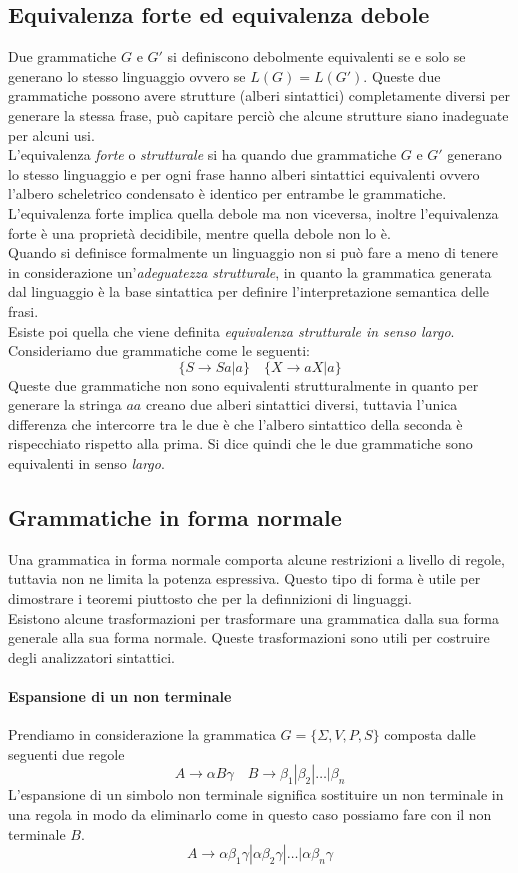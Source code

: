 \subsection{Equivalenza forte ed equivalenza debole}
Due grammatiche $ G $ e $ G' $ si definiscono debolmente equivalenti se e solo se generano lo stesso linguaggio ovvero se $ L(G) = L(G') $. Queste due grammatiche possono avere strutture (alberi sintattici) completamente diversi per generare la stessa frase, può capitare perciò che alcune strutture siano inadeguate per alcuni usi.\\
L'equivalenza \emph{forte} o \emph{strutturale} si ha quando due grammatiche $ G $ e $ G' $ generano lo stesso linguaggio e per ogni frase hanno alberi sintattici equivalenti ovvero l'albero scheletrico condensato è identico per entrambe le grammatiche. L'equivalenza forte implica quella debole ma non viceversa, inoltre l'equivalenza forte è una proprietà decidibile, mentre quella debole non lo è.\\
Quando si definisce formalmente un linguaggio non si può fare a meno di tenere in considerazione un'\emph{adeguatezza strutturale}, in quanto la grammatica generata dal linguaggio è la base sintattica per definire l'interpretazione semantica delle frasi.\\
Esiste poi quella che viene definita \emph{equivalenza strutturale in senso largo}. Consideriamo due grammatiche come le seguenti:
$$\{S\rightarrow Sa|a\} \quad \{X\rightarrow aX | a \} $$
Queste due grammatiche non sono equivalenti strutturalmente in quanto per generare la stringa $ aa $ creano due alberi sintattici diversi, tuttavia l'unica differenza che intercorre tra le due è che l'albero sintattico della seconda è rispecchiato rispetto alla prima. Si dice quindi che le due grammatiche sono equivalenti in senso \emph{largo}.
\subsection{Grammatiche in forma normale}
Una grammatica in forma normale comporta alcune restrizioni a livello di regole, tuttavia non ne limita la potenza espressiva. Questo tipo di forma è utile per dimostrare i teoremi piuttosto che per la definnizioni di linguaggi.\\
Esistono alcune trasformazioni per trasformare una grammatica dalla sua forma generale alla sua forma normale. Queste trasformazioni sono utili per costruire degli analizzatori sintattici.
\paragraph{Espansione di un non terminale}
Prendiamo in considerazione la grammatica $ G = \{\Sigma,V,P,S \} $ composta dalle seguenti due regole
$$A\rightarrow \alpha B \gamma \quad B\rightarrow \beta_1|\beta_2|\dots|\beta_n$$
L'espansione di un simbolo non terminale significa sostituire un non terminale in una regola in modo da eliminarlo come in questo caso possiamo fare con il non terminale $ B $.
$$A\rightarrow \alpha\beta_1\gamma|\alpha\beta_2\gamma|\dots|\alpha\beta_n\gamma$$
